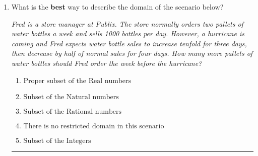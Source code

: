\documentclass[14pt]{extbook}
\newcommand{\litem}[1]{\item#1\hspace*{-1cm}\rule{\textwidth}{0.4pt}}
\begin{document}
\begin{enumerate}
{\begin{enumerate}[label=\Alph*.]
\end{enumerate} }
\litem{
What is the \textbf{best} way to describe the domain of the scenario below?
\begin{center}
    \textit{ Fred is a store manager at Publix. The store normally orders two pallets of water bottles a week and sells 1000 bottles per day. However, a hurricane is coming and Fred expects water bottle sales to increase tenfold for three days, then decrease by half of normal sales for four days. How many more pallets of water bottles should Fred order the week before the hurricane? }
\end{center}
\begin{enumerate}[label=\Alph*.]
\item \( \text{Proper subset of the Real numbers} \)
\item \( \text{Subset of the Natural numbers} \)
\item \( \text{Subset of the Rational numbers} \)
\item \( \text{There is no restricted domain in this scenario} \)
\item \( \text{Subset of the Integers} \)

\end{enumerate} }
\end{enumerate}
\end{document}
